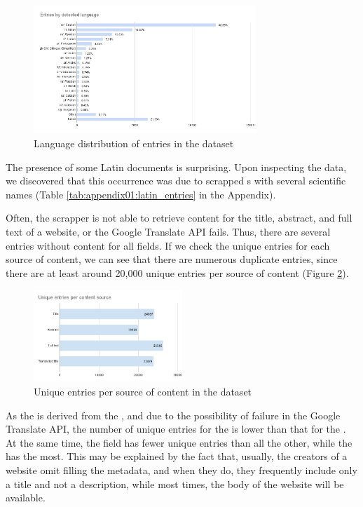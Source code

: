 \begin{figure}
    \centering
    \includegraphics[width=0.75\textwidth]{Figures/04/Entries by detected language.png}
    \caption{Language distribution of entries in the \VSI{} dataset}
    \label{fig:04_vsi_language_distribution}
\end{figure}

The presence of some Latin documents is surprising. Upon inspecting the data, we discovered that this occurrence was due to scrapped \trafilaturaTitle{}s with several scientific names (Table \ref{tab:appendix01:latin_entries} in the Appendix).

Often, the \trafilatura{} scrapper is not able to retrieve content for the title, abstract, and full text of a website, or the Google Translate API fails. Thus, there are several entries without content for all fields. If we check the unique entries for each source of content, we can see that there are numerous duplicate entries, since there are at least around 20,000 unique entries per source of content (Figure \ref{fig:04_unique_entries_vsi}).

\begin{figure}
    \centering
    \includegraphics[width=0.50\textwidth]{Figures/04/Unique entries per content source.png}
    \caption{Unique entries per source of content in the \VSI{} dataset}
    \label{fig:04_unique_entries_vsi}
\end{figure}

As the\translationTitle{} is derived from the \translationTitle{}, and due to the possibility of failure in the Google Translate API, the number of unique entries for the \translationTitle{} is lower than that for the \trafilaturaTitle{}.
At the same time, the \trafilaturaAbstract{} field has fewer unique entries than all the other, while the \trafilaturaFulltext{} has the most. This may be explained by the fact that, usually, the creators of a website omit filling the metadata, and when they do, they frequently include only a title and not a description, while most times, the body of the website will be available. 

